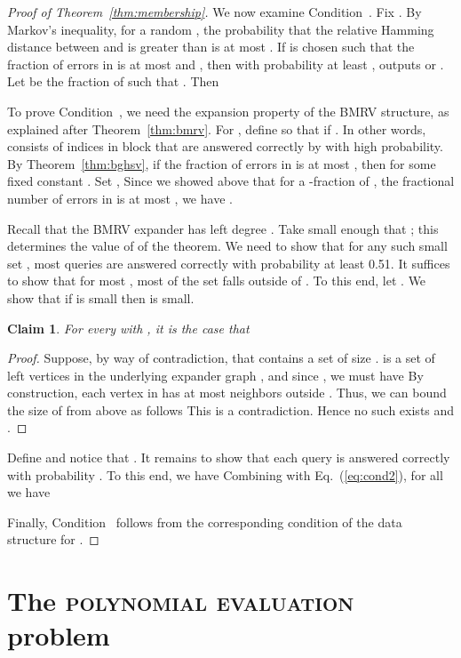 \documentclass[11pt,english]{article}
\newcommand{\noun}[1]{\textsc{#1}}
\newtheorem{claim}[theorem]{Claim}
\theoremstyle{definition}
\theoremstyle{remark}
\begin{document}
\begin{proof}[Proof of Theorem~\ref{thm:membership}]
We now examine Condition~. Fix . By Markov's inequality,
for a random , the probability that the relative Hamming
distance between  and  is greater
than  is at most . If  is chosen such
that the fraction of errors in  is at most 
and , then with probability at least
,  outputs  or . Let 
be the fraction of  such that .
Then 

To prove Condition~, we need the expansion property of the BMRV
structure, as explained after Theorem~\ref{thm:bmrv}. 
For , define  so that
 if .
In other words,  consists of indices in block  that
are answered correctly by  with high probability. By Theorem~\ref{thm:bghsv},
if the fraction of errors in  is at most ,
then  for some fixed constant
. Set , Since we showed
above that for a -fraction of , the fractional
number of errors in  is at most , we have
.

Recall that the BMRV expander has left degree . Take
 small enough that ; this determines
the value of  of the theorem. We need to show that for any
such small set , most queries  are answered correctly
with probability at least 0.51. It suffices to show that for most
, most of the set  falls outside of . To this
end, let . We
show that if  is small then  is small.

\begin{claim} For every  with ,
it is the case that  \end{claim}

\begin{proof} Suppose, by way of contradiction, that  contains
a set  of size .  is a set of left vertices in the underlying
expander graph , and since , we must have 
 By construction, each vertex in  has at most 
neighbors outside . Thus, we can bound the size of 
from above as follows
 This is a contradiction. Hence no such  exists and .
\end{proof}

Define  and notice that .
It remains to show that each query  is answered correctly
with probability . To this end, we have 
 Combining with Eq.~(\ref{eq:cond2}), for all  we have

 Finally, Condition~ follows from the corresponding condition
of the data structure for . \end{proof}

\section{The \noun{polynomial evaluation} problem\label{sec:polynomial evaluation}}
\end{document}
